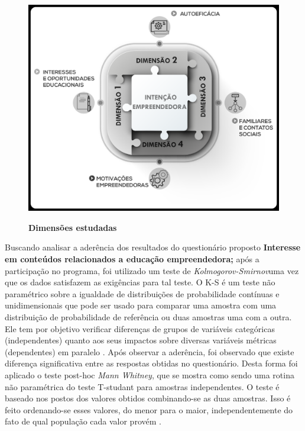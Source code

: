 \begin{figure}[H]
\centering
\caption{\textbf{Dimensões estudadas}}
\includegraphics[scale=0.15]{Imagens/dimencoes.png}
\label{figura_9}
\end{figure}






Buscando analisar a aderência dos resultados do questionário proposto \textbf{Interesse em conteúdos relacionados a educação empreendedora;} após a participação no programa, foi utilizado um teste de \textit{Kolmogorov-Smirnov}uma vez que os dados satisfazem as exigências para tal teste. O K-S é um teste não paramétrico sobre a igualdade de distribuições de probabilidade contínuas e unidimensionais que pode ser usado para comparar uma amostra com uma distribuição de probabilidade de referência ou duas amostras uma com a outra. Ele tem por objetivo verificar diferenças de grupos de variáveis categóricas (independentes) quanto aos seus impactos sobre diversas variáveis métricas (dependentes) em paralelo \cite{hair_alise_2009}. Após observar a aderência, foi observado que existe diferença significativa entre as respostas obtidas no questionário. Desta forma foi aplicado o teste post-hoc \textit{Mann Whitney}, que se mostra como sendo uma rotina não paramétrica do teste T-studant para amostras independentes. O teste  é baseado nos postos dos valores obtidos combinando-se as duas amostras. Isso é feito ordenando-se esses valores, do menor para o maior, independentemente do fato de qual população cada valor provém \cite{matsouaka_optimal_2018}.

